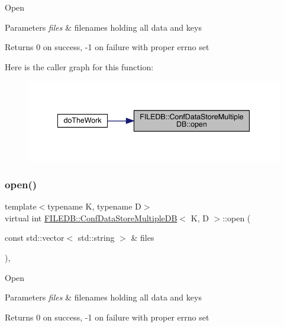 Open 
\begin{DoxyParams}{Parameters}
{\em files} & filenames holding all data and keys\\
\hline
\end{DoxyParams}
\begin{DoxyReturn}{Returns}
0 on success, -\/1 on failure with proper errno set 
\end{DoxyReturn}
Here is the caller graph for this function\+:
\nopagebreak
\begin{figure}[H]
\begin{center}
\leavevmode
\includegraphics[width=341pt]{d3/dc0/classFILEDB_1_1ConfDataStoreMultipleDB_a3370c2f938d91e2352815aa45637b46d_icgraph}
\end{center}
\end{figure}
\mbox{\label{classFILEDB_1_1ConfDataStoreMultipleDB_a3370c2f938d91e2352815aa45637b46d}} 
\subsubsection{\texorpdfstring{open()}{open()}\hspace{0.1cm}{\footnotesize\ttfamily [2/3]}}
{\footnotesize\ttfamily template$<$typename K, typename D$>$ \\
virtual int \mbox{\hyperlink{classFILEDB_1_1ConfDataStoreMultipleDB}{F\+I\+L\+E\+D\+B\+::\+Conf\+Data\+Store\+Multiple\+DB}}$<$ K, D $>$\+::open (\begin{DoxyParamCaption}\item[{const std\+::vector$<$ std\+::string $>$ \&}]{files }\end{DoxyParamCaption})\hspace{0.3cm}{\ttfamily [inline]}, {\ttfamily [virtual]}}

Open 
\begin{DoxyParams}{Parameters}
{\em files} & filenames holding all data and keys\\
\hline
\end{DoxyParams}
\begin{DoxyReturn}{Returns}
0 on success, -\/1 on failure with proper errno set 
\end{DoxyReturn}
\mbox{\label{classFILEDB_1_1ConfDataStoreMultipleDB_a3370c2f938d91e2352815aa45637b46d}} 
